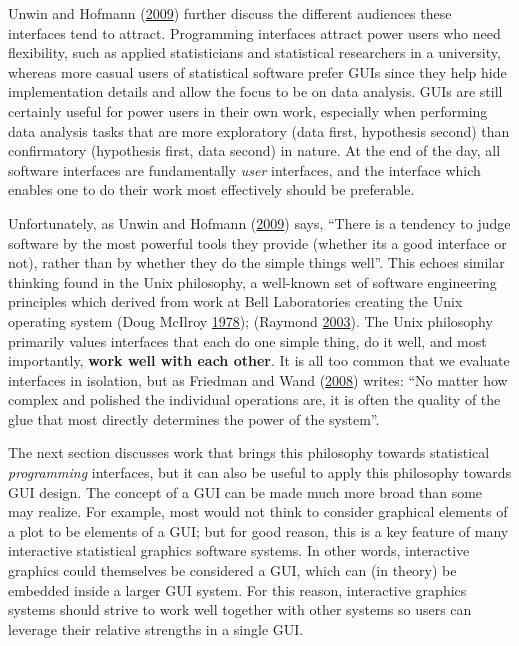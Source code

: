\documentclass[12pt,]{isuthesis}
\begin{document}
Unwin and Hofmann (\protect\hyperlink{ref-Unwin:1999vp}{2009}) further
discuss the different audiences these interfaces tend to attract.
Programming interfaces attract power users who need flexibility, such as
applied statisticians and statistical researchers in a university,
whereas more casual users of statistical software prefer GUIs since they
help hide implementation details and allow the focus to be on data
analysis. GUIs are still certainly useful for power users in their own
work, especially when performing data analysis tasks that are more
exploratory (data first, hypothesis second) than confirmatory
(hypothesis first, data second) in nature. At the end of the day, all
software interfaces are fundamentally \emph{user} interfaces, and the
interface which enables one to do their work most effectively should be
preferable.

Unfortunately, as Unwin and Hofmann
(\protect\hyperlink{ref-Unwin:1999vp}{2009}) says, ``There is a tendency
to judge software by the most powerful tools they provide (whether its a
good interface or not), rather than by whether they do the simple things
well''. This echoes similar thinking found in the Unix philosophy, a
well-known set of software engineering principles which derived from
work at Bell Laboratories creating the Unix operating system (Doug
McIlroy \protect\hyperlink{ref-unix}{1978}); (Raymond
\protect\hyperlink{ref-unix-philosophy}{2003}). The Unix philosophy
primarily values interfaces that each do one simple thing, do it well,
and most importantly, \textbf{work well with each other}. It is all too
common that we evaluate interfaces in isolation, but as Friedman and
Wand (\protect\hyperlink{ref-eopl}{2008}) writes: ``No matter how
complex and polished the individual operations are, it is often the
quality of the glue that most directly determines the power of the
system''.

The next section discusses work that brings this philosophy towards
statistical \emph{programming} interfaces, but it can also be useful to
apply this philosophy towards GUI design. The concept of a GUI can be
made much more broad than some may realize. For example, most would not
think to consider graphical elements of a plot to be elements of a GUI;
but for good reason, this is a key feature of many interactive
statistical graphics software systems. In other words, interactive
graphics could themselves be considered a GUI, which can (in theory) be
embedded inside a larger GUI system. For this reason, interactive
graphics systems should strive to work well together with other systems
so users can leverage their relative strengths in a single GUI.
\end{document}
